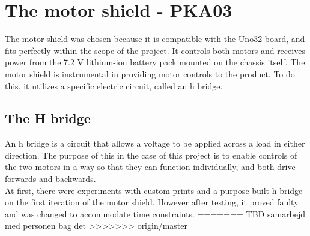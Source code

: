 \section{The motor shield - PKA03}

The motor shield was chosen because it is compatible with the Uno32 board, and fits perfectly within the scope of the project. It controls both motors and receives power from the 7.2 V lithium-ion battery pack mounted on the chassis itself. The motor shield is instrumental in providing motor controls to the product. To do this, it utilizes a specific electric circuit, called an h bridge.

\subsection{The H bridge}

An h bridge is a circuit that allows a voltage to be applied across a load in either direction. The purpose of this in the case of this project is to enable controls of the two motors in a way so that they can function individually, and both drive forwards and backwards.\\
At first, there were experiments with custom prints and a purpose-built h bridge on the first iteration of the motor shield. However after testing, it proved faulty and was changed to accommodate time constraints.
=======
TBD samarbejd med personen bag det
>>>>>>> origin/master

